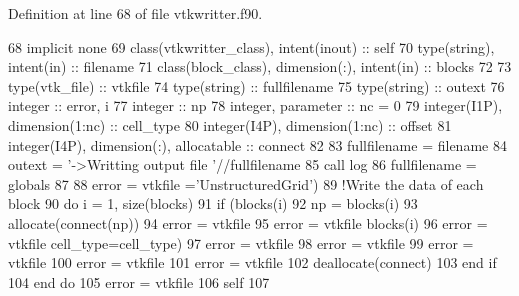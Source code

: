 Definition at line 68 of file vtkwritter.\+f90.


\begin{DoxyCode}
68     \textcolor{keywordtype}{implicit none}
69     \textcolor{keywordtype}{class}(vtkwritter\_class), \textcolor{keywordtype}{intent(inout)} :: self
70     \textcolor{keywordtype}{type}(string), \textcolor{keywordtype}{intent(in)} :: filename
71     \textcolor{keywordtype}{class}(block\_class), \textcolor{keywordtype}{dimension(:)}, \textcolor{keywordtype}{intent(in)} :: blocks
72     
73     \textcolor{keywordtype}{type}(vtk\_file) :: vtkfile
74     \textcolor{keywordtype}{type}(string) :: fullfilename
75     \textcolor{keywordtype}{type}(string) :: outext
76     \textcolor{keywordtype}{integer} :: error, i
77     \textcolor{keywordtype}{integer} :: np
78     \textcolor{keywordtype}{integer}, \textcolor{keywordtype}{parameter} :: nc = 0
79     \textcolor{keywordtype}{integer(I1P)}, \textcolor{keywordtype}{dimension(1:nc)} :: cell\_type
80     \textcolor{keywordtype}{integer(I4P)}, \textcolor{keywordtype}{dimension(1:nc)} :: offset
81     \textcolor{keywordtype}{integer(I4P)}, \textcolor{keywordtype}{dimension(:)}, \textcolor{keywordtype}{allocatable} :: connect
82 
83     fullfilename = filename%
84     outext = \textcolor{stringliteral}{'->Writting output file '}//fullfilename
85     \textcolor{keyword}{call }log%
86     fullfilename = globals%
87     
88     error = vtkfile%
      =\textcolor{stringliteral}{'UnstructuredGrid'})
89     \textcolor{comment}{!Write the data of each block}
90     \textcolor{keywordflow}{do} i = 1, \textcolor{keyword}{size}(blocks)
91         \textcolor{keywordflow}{if} (blocks(i)%
92             np = blocks(i)%
93             \textcolor{keyword}{allocate}(connect(np))
94             error = vtkfile%
95             error = vtkfile%
      blocks(i)%
96             error = vtkfile%
      cell\_type=cell\_type)
97             error = vtkfile%
98             error = vtkfile%
99             error = vtkfile%
100             error = vtkfile%
101             error = vtkfile%
102             \textcolor{keyword}{deallocate}(connect)
103 \textcolor{keywordflow}{        end if}
104 \textcolor{keywordflow}{    end do}
105     error = vtkfile%
106     self%
107     
\end{DoxyCode}



